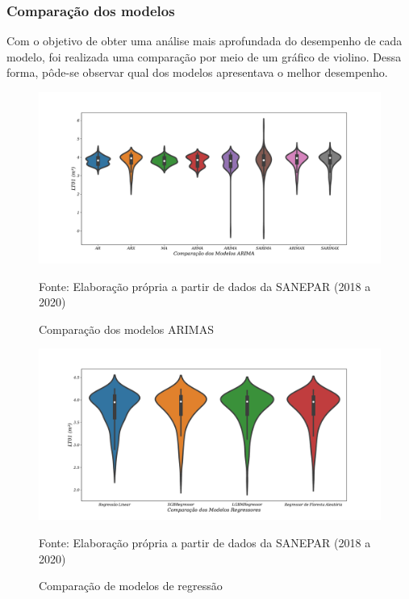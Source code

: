 \subsubsection{Compara\c c\~ao dos modelos}

Com o objetivo de obter uma análise mais aprofundada do desempenho de cada modelo, foi realizada uma comparação por meio de um gráfico de violino. Dessa forma, pôde-se observar qual dos modelos apresentava o melhor desempenho.


\begin{figure}[H]
	\centering
	\caption{Comparação dos modelos ARIMAS}
	\includegraphics[width=0.9\linewidth]{Resultados/Figuras/modelos-arima}
	
	\label{fig:modelos-arima}
	
	Fonte: Elaboração própria a partir de dados da SANEPAR (2018 a 2020)
\end{figure}


\begin{figure}[H]
	\centering
	\caption{Comparação de modelos de regressão }
	\includegraphics[width=0.9\linewidth]{Resultados/Figuras/violin-LR-XGB-LGBM-RF}
	
	\label{fig:violin-lr-xgb-lgbm-rf}
	
	Fonte: Elaboração própria a partir de dados da SANEPAR (2018 a 2020)
\end{figure}

